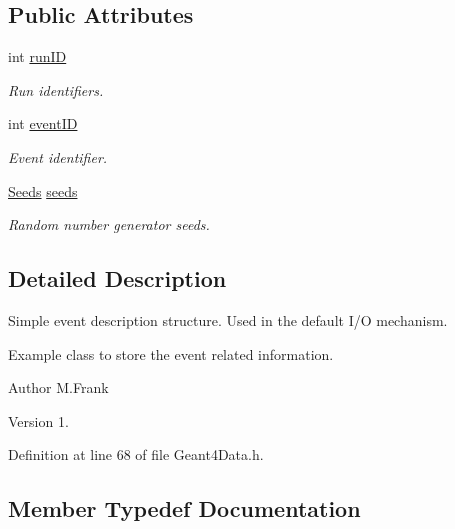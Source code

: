 \subsection*{Public Attributes}
\begin{DoxyCompactItemize}
\item 
int \hyperlink{class_d_d4hep_1_1_simulation_1_1_simple_event_a128035e74755e19ac0fc4526e959a96c}{run\+ID}
\begin{DoxyCompactList}\small\item\em Run identifiers. \end{DoxyCompactList}\item 
int \hyperlink{class_d_d4hep_1_1_simulation_1_1_simple_event_a6c196367ec2be5a8cad2afe89d038a6d}{event\+ID}
\begin{DoxyCompactList}\small\item\em Event identifier. \end{DoxyCompactList}\item 
\hyperlink{class_d_d4hep_1_1_simulation_1_1_simple_event_a0a0e9b422036edb384b60a6f492eb8d4}{Seeds} \hyperlink{class_d_d4hep_1_1_simulation_1_1_simple_event_a6284fef7dbe512536fad17533444e325}{seeds}
\begin{DoxyCompactList}\small\item\em Random number generator seeds. \end{DoxyCompactList}\end{DoxyCompactItemize}


\subsection{Detailed Description}
Simple event description structure. Used in the default I/O mechanism. 

Example class to store the event related information.

\begin{DoxyAuthor}{Author}
M.\+Frank 
\end{DoxyAuthor}
\begin{DoxyVersion}{Version}
1. 
\end{DoxyVersion}


Definition at line 68 of file Geant4\+Data.\+h.



\subsection{Member Typedef Documentation}
\hypertarget{class_d_d4hep_1_1_simulation_1_1_simple_event_a0a0e9b422036edb384b60a6f492eb8d4}{}\label{class_d_d4hep_1_1_simulation_1_1_simple_event_a0a0e9b422036edb384b60a6f492eb8d4} 
